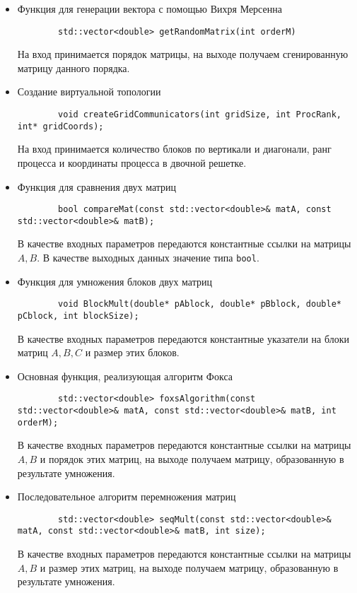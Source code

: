 \documentclass{report}
\begin{document}
\begin{itemize}
    \item Функция для генерации вектора с помощью Вихря Мерсенна
    \begin{lstlisting}
        std::vector<double> getRandomMatrix(int orderM)
    \end{lstlisting}
    \par На вход принимается порядок матрицы, на выходе получаем сгенированную матрицу данного порядка.
    \item Создание виртуальной топологии
     \begin{lstlisting}
        void createGridCommunicators(int gridSize, int ProcRank, int* gridCoords);
    \end{lstlisting}
    \par На вход принимается количество блоков по вертикали и диагонали, ранг процесса и координаты процесса в двочной решетке.
    \item Функция для сравнения двух матриц
     \begin{lstlisting}
        bool compareMat(const std::vector<double>& matA, const std::vector<double>& matB);
    \end{lstlisting}
    \par В качестве входных параметров передаются константные ссылки на матрицы {\itshape $A, B$}. В качестве выходных данных значение типа \verb|bool|.
    \item Функция для умножения блоков двух матриц
     \begin{lstlisting}
        void BlockMult(double* pAblock, double* pBblock, double* pCblock, int blockSize);
    \end{lstlisting}
    \par В качестве входных параметров передаются константные указатели на блоки матриц {\itshape $A, B, C$} и размер этих блоков.
     \item Основная функция, реализующая алгоритм Фокса
     \begin{lstlisting}
        std::vector<double> foxsAlgorithm(const std::vector<double>& matA, const std::vector<double>& matB, int orderM);
    \end{lstlisting}
    \par В качестве входных параметров передаются константные ссылки на матрицы {\itshape $A, B$} и порядок этих матриц, на выходе получаем матрицу, образованную в результате умножения.
    \item Последовательное алгоритм перемножения матриц
     \begin{lstlisting}
        std::vector<double> seqMult(const std::vector<double>& matA, const std::vector<double>& matB, int size);
    \end{lstlisting}
    \par В качестве входных параметров передаются константные ссылки на матрицы {\itshape $A, B$} и размер этих матриц, на выходе получаем матрицу, образованную в результате умножения.
\end{itemize}
\end{document}
